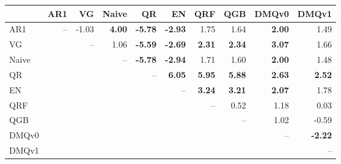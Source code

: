 \begin{tabular}{lrrrrrrrrr}
\toprule
 & AR1 & VG & Naive & QR & EN & QRF & QGB & DMQv0 & DMQv1 \\
\midrule
AR1 & -- & -1.03 & \textbf{4.00} & \textbf{-5.78} & \textbf{-2.93} & 1.75 & 1.64 & \textbf{2.00} & 1.49 \\
VG &  & -- & 1.06 & \textbf{-5.59} & \textbf{-2.69} & \textbf{2.31} & \textbf{2.34} & \textbf{3.07} & 1.66 \\
Naive &  &  & -- & \textbf{-5.78} & \textbf{-2.94} & 1.71 & 1.60 & \textbf{2.00} & 1.48 \\
QR &  &  &  & -- & \textbf{6.05} & \textbf{5.95} & \textbf{5.88} & \textbf{2.63} & \textbf{2.52} \\
EN &  &  &  &  & -- & \textbf{3.24} & \textbf{3.21} & \textbf{2.07} & 1.78 \\
QRF &  &  &  &  &  & -- & 0.52 & 1.18 & 0.03 \\
QGB &  &  &  &  &  &  & -- & 1.02 & -0.59 \\
DMQv0 &  &  &  &  &  &  &  & -- & \textbf{-2.22} \\
DMQv1 &  &  &  &  &  &  &  &  & -- \\
\bottomrule
\end{tabular}
